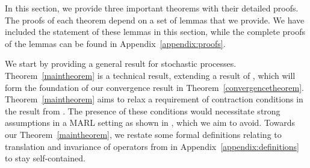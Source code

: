 \documentclass[jair, twoside,11pt,theapa]{article}
\begin{document}
In this section, we provide three important theorems with their detailed proofs. The proofs of each theorem depend on a set of lemmas that we provide. We have included the statement of these lemmas in this section, while the complete proofs of the lemmas can be found in Appendix~\ref{appendix:proofs}. 
 


We start by providing a general result for stochastic processes. Theorem~\ref{maintheorem} is a technical result, extending a result of   \citet{szepesvari1999unified}, which will form the foundation of our convergence result in Theorem~\ref{convergencetheorem}.  Theorem~\ref{maintheorem} aims to relax a requirement of contraction conditions in the result from \citet{szepesvari1999unified}. The presence of these conditions would necessitate strong assumptions in a MARL setting as shown in \citet{hu2003nash}, which we aim to avoid. Towards our Theorem~\ref{maintheorem}, we restate some formal definitions relating to translation and invariance of operators from \citet{szepesvari1999unified} in Appendix~\ref{appendix:definitions} to stay self-contained.
\end{document}
